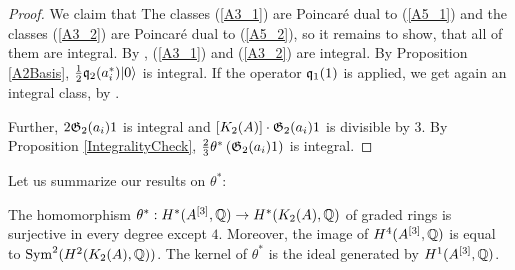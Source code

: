 \begin{proof}
We claim that
The classes (\ref{A3_1}) are Poincar\'e dual to (\ref{A5_1}) and the classes (\ref{A3_2}) are Poincar\'e dual to (\ref{A5_2}), so it remains to show, that all of them are integral.
By \cite{QinWang}, (\ref{A3_1}) and (\ref{A3_2}) are integral. By Proposition \ref{A2Basis}, $\frac{1}{2}\q_2(a^*_i)\vac$ is integral. If the operator $ \q_1(1)$ is applied, we get again an integral class, by \cite[Lemma 3.3]{QinWang}.

Further, $2\G_2(a_i)1$ is integral and $[\kum{A}{2}]\cdot \G_2(a_i)1$ is divisible by $3$. By Proposition \ref{IntegralityCheck}, $\frac{2}{3} \theta^*\left( \G_2(a_i)1 \right)$ is integral.
\end{proof}



Let us summarize our results on $\theta^*$:
\begin{theorem}
The homomorphism $\theta^* : H^*(A\hilb{3},\Q)\rightarrow H^*(\kum{A}{2},\Q)$ of graded rings is surjective in every degree except $4$. Moreover, the image of $H^4(A\hilb{3},\Q)$ is equal to $\Sym^2(H^2(\kum{A}{2},\Q))$. 
The kernel of $\theta^*$ is the ideal generated by $H^1(A\hilb{3},\Q)$.
\end{theorem}